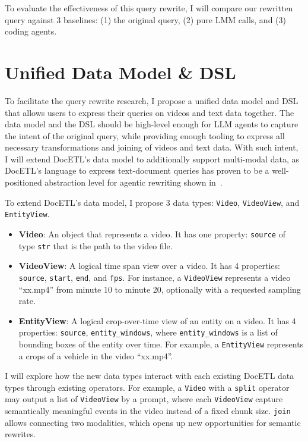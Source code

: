 \documentclass[sigconf,nonacm,screen]{acmart}
\begin{document}
To evaluate the effectiveness of this query rewrite,
I will compare our rewritten query against 3 baselines:
(1) the original query,
(2) pure LMM calls,
and (3) coding agents.

\section{Unified Data Model \& DSL}

To facilitate the query rewrite research, I propose a unified data model and DSL
that allows users to express their queries on videos and text data together.
The data model and the DSL should be high-level enough for LLM agents to capture the intent of the original query,
while providing enough tooling to express all necessary transformations and joining of videos and text data.
With such intent, I will extend DocETL's data model to additionally support multi-modal data,
as DocETL's language to express text-document queries has proven to be a well-positioned abstraction level
for agentic rewriting shown in~\cite{shankar2025docetl,wei2026moar}.

To extend DocETL's data model, I propose 3 data types: {\tt Video}, {\tt VideoView}, and {\tt EntityView}.
\begin{itemize}
    \item \textbf{Video}: An object that represents a video. It has one property: {\tt source} of type {\tt str} that is the path to the video file.
    \item \textbf{VideoView}: A logical time span view over a video. It has 4 properties: {\tt source}, {\tt start}, {\tt end}, and {\tt fps}. For instance, a {\tt VideoView} represents a video ``xx.mp4'' from minute 10 to minute 20, optionally with a requested sampling rate.
    \item \textbf{EntityView}: A logical crop-over-time view of an entity on a video. It has 4 properties: {\tt source}, {\tt entity\_windows}, where {\tt entity\_windows} is a list of bounding boxes of the entity over time. For example, a {\tt EntityView} represents a crops of a vehicle in the video ``xx.mp4''.
\end{itemize}

I will explore how the new data types interact with each existing DocETL data types through existing operators.
For example, a {\tt Video} with a {\tt split} operator may output a list of {\tt VideoView} by a prompt,
where each {\tt VideoView} capture semantically meaningful events in the video instead of a fixed chunk size.
{\tt join} allows connecting two modalities, which opens up new opportunities for semantic rewrites.
\end{document}
